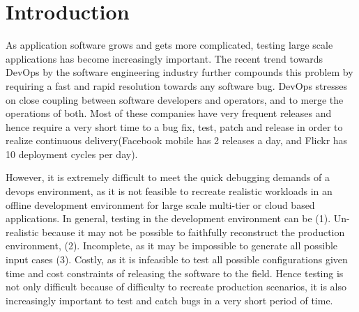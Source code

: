 \section{Introduction}
\label{sec:intro}


As application software grows and gets more complicated, testing large scale applications has become increasingly important. 
The recent trend towards DevOps\cite{devops} by the software engineering industry further compounds this problem by requiring a fast and rapid resolution towards any software bug.
DevOps stresses on close coupling between software developers and operators, and to merge the operations of both. 
Most of these companies have very frequent releases and hence require a very short time to a bug fix, test, patch and release in order to realize continuous delivery(Facebook mobile has 2 releases a day, and Flickr has 10 deployment cycles per day).

However, it is extremely difficult to meet the quick debugging demands of a devops environment, as it is not feasible to recreate realistic workloads in an offline development environment for large scale multi-tier or cloud based applications.
In general, testing in the development environment can be (1). Un-realistic because it may not be possible to faithfully reconstruct the production environment, (2). Incomplete, as it may be impossible to generate all possible input cases (3). Costly, as it is infeasible to test all possible configurations given time and cost constraints of releasing the software to the field. 
Hence testing is not only difficult because of difficulty to recreate production scenarios, it is also increasingly important to test and catch bugs in a very short period of time.

